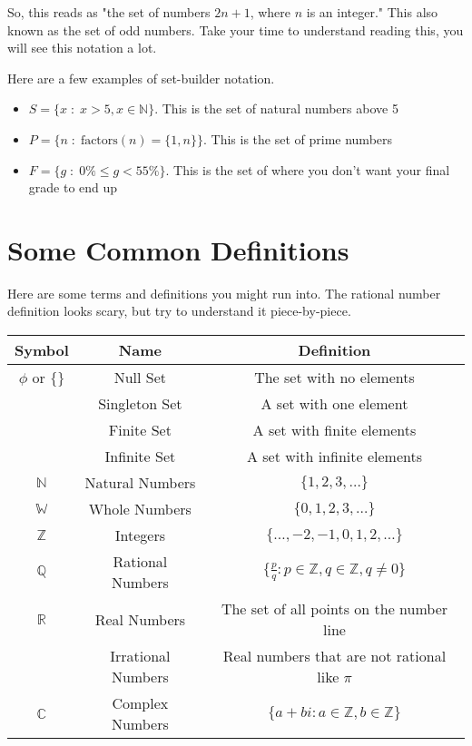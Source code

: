 So, this reads as "the set of numbers $2n+1$, where $n$ is an integer." This also known as the set of odd numbers. Take your time to understand reading this, you will see this notation a lot.

\myexample
{
	Here are a few examples of set-builder notation.
	\begin{itemize}
		\item $S = \{x \;:\; x > 5, x \in \mathbb{N}\}$. This is the set of natural numbers above 5
		\item $P = \{n \;:\; \text{factors}(n) = \{1,n\}\}$. This is the set of prime numbers
		\item $F = \{g \;:\; 0\% \leq g < 55\%\}$. This is the set of where you don't want your final grade to end up
	\end{itemize}
}
	
\section{Some Common Definitions}

Here are some terms and definitions you might run into. The rational number definition looks scary, but try to understand it piece-by-piece.

\begin{tabular}{|c|c|c|}
\hline
Symbol & Name & Definition\\
\hline
$\phi$ or $\{\}$ & Null Set & The set with no elements\\
 & Singleton Set & A set with one element\\
 & Finite Set & A set with finite elements\\
 & Infinite Set & A set with infinite elements\\
$\mathbb{N}$ & Natural Numbers & $\{1,2,3,\dots\}$\\
$\mathbb{W}$ & Whole Numbers & $\{0,1,2,3,\dots\}$\\
$\mathbb{Z}$ & Integers & $\{\dots, -2, -1, 0, 1, 2, \dots\}$\\
$\mathbb{Q}$ & Rational Numbers &
$\displaystyle \bigg\{ \frac{p}{q} : p \in \mathbb{Z}, q \in \mathbb{Z}, q \neq 0 \bigg\}$\\
$\mathbb{R}$ & Real Numbers & The set of all points on the number line\\
	& Irrational Numbers & Real numbers that are not rational like $\pi$\\
$\mathbb{C}$ & Complex Numbers & $\{a+bi : a \in \mathbb{Z}, b \in \mathbb{Z}\}$\\
\hline
\end{tabular}

